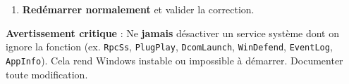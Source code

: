 \documentclass[11pt]{article}
\begin{document}
\begin{methode}
\begin{enumerate}
    \begin{enumerate}
    \item \texttt{Windows}+\texttt{R} $\rightarrow$ \texttt{services.msc} $\rightarrow$ \texttt{Entrée}.
    \item Repérer le service (Nom / Nom d'affichage). Double-clic.
    \item Cliquer \emph{Arrêter} (si en cours). \emph{Type de démarrage} : choisir \emph{Manuel} (démarrage à la demande) ou \emph{Désactivé} (jamais). \emph{Appliquer} / \emph{OK}.
    \item \textbf{Alternative pour programmes « user »} : \texttt{Ctrl}+\texttt{Maj}+\texttt{Échap} (Gestionnaire des tâches) $\rightarrow$ Onglet \emph{Démarrage} $\rightarrow$ Clic droit sur l'application $\rightarrow$ \emph{Désactiver}. Plus simple pour Spotify, Steam, OneDrive, etc.
    \end{enumerate}
\item \textbf{Redémarrer normalement} et valider la correction.
\end{enumerate}
\textbf{Avertissement critique} : Ne \textbf{jamais} désactiver un service système dont on ignore la fonction (ex. \texttt{RpcSs}, \texttt{PlugPlay}, \texttt{DcomLaunch}, \texttt{WinDefend}, \texttt{EventLog}, \texttt{AppInfo}). Cela rend Windows instable ou impossible à démarrer. Documenter toute modification.
\end{methode}
\end{document}

